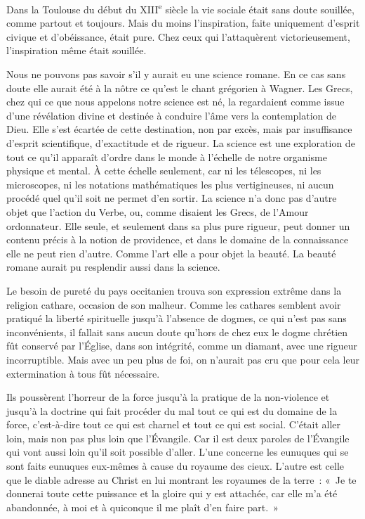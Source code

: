 \documentclass[french,twoside]{book} %
\begin{document}
Dans la Toulouse du début du XIII\textsuperscript{e} siècle la vie sociale était sans doute souillée, comme partout et toujours. Mais du moins l'inspiration, faite unique­ment d'esprit civique et d'obéissance, était pure. Chez ceux qui l'attaquèrent victorieusement, l'inspiration même était souillée.\par
Nous ne pouvons pas savoir s'il y aurait eu une science romane. En ce cas sans doute elle aurait été à la nôtre ce qu'est le chant grégorien à Wagner. Les Grecs, chez qui ce que nous appelons notre science est né, la regardaient comme issue d'une révélation divine et destinée à conduire l'âme vers la contemplation de Dieu. Elle s'est écartée de cette destination, non par excès, mais par insuffisance d'esprit scientifique, d'exactitude et de rigueur. La science est une exploration de tout ce qu'il apparaît d'ordre dans le monde à l'échelle de notre organisme physique et mental. À cette échelle seulement, car ni les télescopes, ni les microscopes, ni les notations mathématiques les plus vertigineuses, ni aucun procédé quel qu'il soit ne permet d'en sortir. La science n'a donc pas d'autre objet que l'action du Verbe, ou, comme disaient les Grecs, de l'Amour ordonnateur. Elle seule, et seulement dans sa plus pure rigueur, peut donner un contenu précis à la notion de providence, et dans le domaine de la connaissance elle ne peut rien d'autre. Comme l'art elle a pour objet la beauté. La beauté romane aurait pu resplendir aussi dans la science.\par
Le besoin de pureté du pays occitanien trouva son expression extrême dans la religion cathare, occasion de son malheur. Comme les cathares sem­blent avoir pratiqué la liberté spirituelle jusqu'à l'absence de dogmes, ce qui n'est pas sans inconvénients, il fallait sans aucun doute qu'hors de chez eux le dogme chrétien fût conservé par l'Église, dans son intégrité, comme un dia­mant, avec une rigueur incorruptible. Mais avec un peu plus de foi, on n'aurait pas cru que pour cela leur extermination à tous fût nécessaire.\par
Ils poussèrent l'horreur de la force jusqu'à la pratique de la non-violence et jusqu'à la doctrine qui fait procéder du mal tout ce qui est du domaine de la force, c'est-à-dire tout ce qui est charnel et tout ce qui est social. C'était aller loin, mais non pas plus loin que l'Évangile. Car il est deux paroles de l'Évangile qui vont aussi loin qu'il soit possible d'aller. L'une concerne les eunuques qui se sont faits eunuques eux-mêmes à cause du royaume des cieux. L'autre est celle que le diable adresse au Christ en lui montrant les royaumes de la terre : « Je te donnerai toute cette puissance et la gloire qui y est attachée, car elle m'a été abandonnée, à moi et à quiconque il me plaît d'en faire part. »\par
\end{document}
